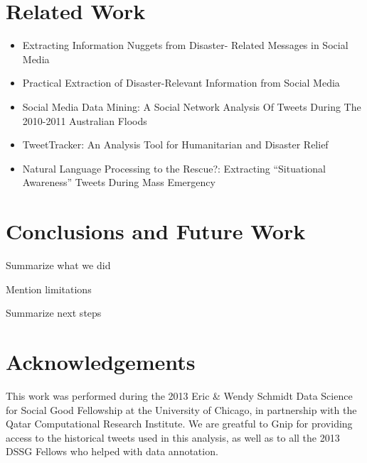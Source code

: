 \documentclass{article}
\begin{document}
\section{Related Work}
\begin{itemize}
\item Extracting Information Nuggets from Disaster- Related Messages in Social Media
\item Practical Extraction of Disaster-Relevant Information from Social Media
\item Social Media Data Mining: A Social Network Analysis Of Tweets During The 2010-2011 Australian Floods
\item TweetTracker: An Analysis Tool for Humanitarian and Disaster Relief
\item Natural Language Processing to the Rescue?: Extracting “Situational Awareness” Tweets During Mass Emergency
\end{itemize}



\section{Conclusions and Future Work}
\begin{outline}
  \item Summarize what we did
  \item Mention limitations
  \item Summarize next steps
\end{outline}

\section{Acknowledgements}
This work was performed during the 2013 Eric \& Wendy Schmidt Data Science for
Social Good Fellowship at the University of Chicago, in partnership with the
Qatar Computational Research Institute. We are greatful to Gnip for providing
access to the historical tweets used in this analysis, as well as to all the
2013 DSSG Fellows who helped with data annotation.
\end{document}
